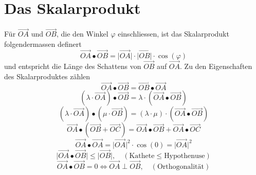 \section{Das Skalarprodukt}
Für $\overrightarrow{OA}$ und $\overrightarrow{OB}$, die den Winkel $\varphi$ einschliessen, ist das Skalarprodukt folgendermassen definert
\begin{equation} 
\boxed{\overrightarrow{OA}\bullet \overrightarrow{OB}=\Big\vert \overrightarrow{OA}\Big\vert\cdot \Big\vert \overrightarrow{OB}\Big\vert\cdot \cos\left(\varphi\right)}
\end{equation} 
und entspricht die Länge des Schattens von $\overrightarrow{OB}$ auf $\overrightarrow{OA}$. Zu den Eigenschaften des Skalarproduktes zählen
\begin{equation}
\boxed{\overrightarrow{OA}\bullet \overrightarrow{OB}=\overrightarrow{OB}\bullet \overrightarrow{OA}}
\end{equation}
\begin{equation}
\boxed{\left(\lambda\cdot \overrightarrow{OA}\right)\bullet \overrightarrow{OB}=\lambda\cdot \left(\overrightarrow{OA}\bullet \overrightarrow{OB}\right)}
\end{equation}
\begin{equation}
\boxed{\left(\lambda\cdot\overrightarrow{OA}\right)\bullet \left(\mu\cdot\overrightarrow{OB}\right)=\left(\lambda\cdot \mu\right)\cdot \left(\overrightarrow{OA}\bullet \overrightarrow{OB}\right)}
\end{equation}
\begin{equation}
\boxed{\overrightarrow{OA}\bullet \left(\overrightarrow{OB}+\overrightarrow{OC}\right)=\overrightarrow{OA}\bullet \overrightarrow{OB}+\overrightarrow{OA}\bullet \overrightarrow{OC}}
\end{equation}
\begin{equation}
\boxed{\overrightarrow{OA}\bullet \overrightarrow{OA}=\Big\vert\overrightarrow{OA}\Big\vert^2\cdot \cos\left(0\right)=\Big\vert\overrightarrow{OA}\Big\vert^2}
\end{equation}
\begin{equation}
\boxed{\Big\vert\overrightarrow{OA}\bullet\overrightarrow{OB}\Big\vert\leq\Big\vert\overrightarrow{OB}\Big\vert,\quad (\text{Kathete}\leq\text{Hypothenuse})}
\end{equation}
\begin{equation}
\boxed{\overrightarrow{OA}\bullet \overrightarrow{OB}=0\Leftrightarrow \overrightarrow{OA}\perp \overrightarrow{OB},\quad (\text{Orthogonalität})}
\end{equation}
